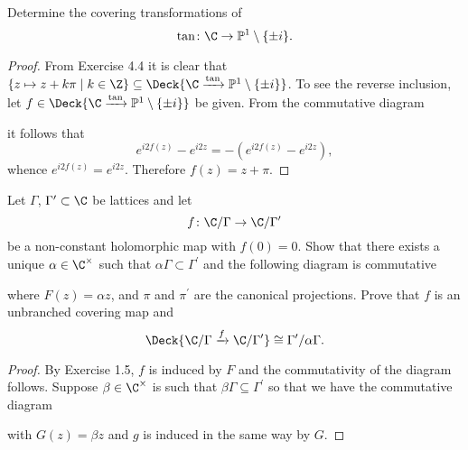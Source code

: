 \documentclass[10pt]{amsart}
\begin{document}
\begin{thm}
  Determine the covering transformations of
  $$\tan \colon \C \rightarrow \mathbb{P}^1 \setminus \{\pm i\}.$$
  
  \begin{proof}
    From Exercise 4.4 it is clear that $\left\{ z \mapsto z + k\pi \;\middle\vert\; k \in \Z \right\} \subseteq \Deck{\C \xrightarrow{\tan} \mathbb{P}^1 \setminus \{\pm i\}}$.
    To see the reverse inclusion, let $f \in \Deck{\C \xrightarrow{\tan} \mathbb{P}^1 \setminus \{\pm i\}}$ be given.
    From the commutative diagram
    \begin{center}
    \end{center}
    it follows that
    $$e^{i2f(z)} - e^{i2z} = -(e^{i2f(z)} - e^{i2z}),$$
    whence $e^{i2f(z)} = e^{i2z}$.
    Therefore $f(z) = z + \pi$.
  \end{proof}
\end{thm}

\begin{thm}
  Let $\Gamma$, $\Gamma^\prime \subset \C$ be lattices and let
  $$f \colon \C / \Gamma \rightarrow \C / \Gamma^\prime$$
  be a non-constant holomorphic map with $f(0) = 0$.
  Show that there exists a unique $\alpha \in \C^\times$ such that $\alpha\Gamma \subset \Gamma^\prime$ and the following diagram is commutative
  \begin{center}
  \end{center}
  where $F(z) = \alpha z$, and $\pi$ and $\pi^\prime$ are the canonical projections.
  Prove that $f$ is an unbranched covering map and
  $$\Deck{\C/\Gamma \xrightarrow{f} \C/\Gamma^\prime} \cong \Gamma^\prime / \alpha\Gamma.$$

  \begin{proof}
    By Exercise 1.5, $f$ is induced by $F$ and the commutativity of the diagram follows.
    Suppose $\beta \in \C^\times$ is such that $\beta\Gamma \subseteq \Gamma^\prime$ so that we have the commutative diagram
    \begin{center}
    \end{center}
    with $G(z) = \beta z$ and $g$ is induced in the same way by $G$.
  \end{proof}
\end{thm}
\end{document}

